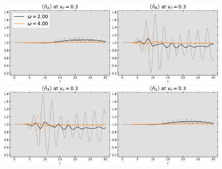 \begin{figure}[!hbt]
    \begin{minipage}[b]{.49\textwidth}
                \centering
                \includegraphics[trim=0 0 0 -4, clip, width=0.49\textwidth]{graph/occupation/occupation_site_2_vc_03.pdf}
                \includegraphics[trim=0 0 0 -4, clip, width=0.49\textwidth]{graph/occupation/occupation_site_0_vc_03.pdf}
                \includegraphics[trim=0 0 0 -4, clip, width=0.49\textwidth]{graph/occupation/occupation_site_3_vc_03.pdf}
                \includegraphics[trim=0 0 0 -4, clip, width=0.49\textwidth]{graph/occupation/occupation_site_1_vc_03.pdf}

\end{minipage}
\end{figure}
